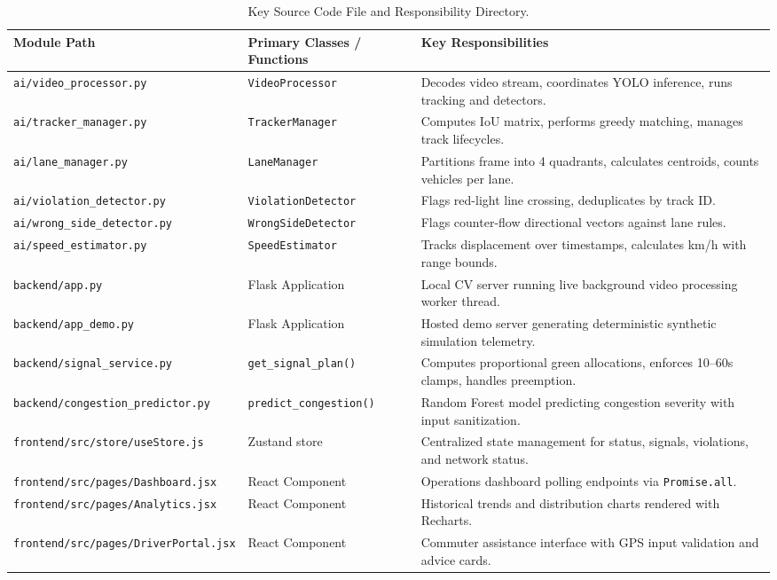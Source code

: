 \documentclass[11pt,a4paper,oneside]{report}
\begin{document}
\begin{table}[H]
\centering
\small
\begin{tabularx}{\textwidth}{l p{4.2cm} X}
\toprule
\textbf{Module Path} & \textbf{Primary Classes / Functions} & \textbf{Key Responsibilities} \\
\midrule
\texttt{ai/video\_processor.py} & \texttt{VideoProcessor} & Decodes video stream, coordinates YOLO inference, runs tracking and detectors. \\
\texttt{ai/tracker\_manager.py} & \texttt{TrackerManager} & Computes IoU matrix, performs greedy matching, manages track lifecycles. \\
\texttt{ai/lane\_manager.py} & \texttt{LaneManager} & Partitions frame into 4 quadrants, calculates centroids, counts vehicles per lane. \\
\texttt{ai/violation\_detector.py} & \texttt{ViolationDetector} & Flags red-light line crossing, deduplicates by track ID. \\
\texttt{ai/wrong\_side\_detector.py} & \texttt{WrongSideDetector} & Flags counter-flow directional vectors against lane rules. \\
\texttt{ai/speed\_estimator.py} & \texttt{SpeedEstimator} & Tracks displacement over timestamps, calculates km/h with range bounds. \\
\texttt{backend/app.py} & Flask Application & Local CV server running live background video processing worker thread. \\
\texttt{backend/app\_demo.py} & Flask Application & Hosted demo server generating deterministic synthetic simulation telemetry. \\
\texttt{backend/signal\_service.py} & \texttt{get\_signal\_plan()} & Computes proportional green allocations, enforces 10--60s clamps, handles preemption. \\
\texttt{backend/congestion\_predictor.py} & \texttt{predict\_congestion()} & Random Forest model predicting congestion severity with input sanitization. \\
\texttt{frontend/src/store/useStore.js} & Zustand store & Centralized state management for status, signals, violations, and network status. \\
\texttt{frontend/src/pages/Dashboard.jsx} & React Component & Operations dashboard polling endpoints via \texttt{Promise.all}. \\
\texttt{frontend/src/pages/Analytics.jsx} & React Component & Historical trends and distribution charts rendered with Recharts. \\
\texttt{frontend/src/pages/DriverPortal.jsx} & React Component & Commuter assistance interface with GPS input validation and advice cards. \\
\bottomrule
\end{tabularx}
\caption{Key Source Code File and Responsibility Directory.}
\label{tab:glossary_source_map}
\end{table}
\end{document}

